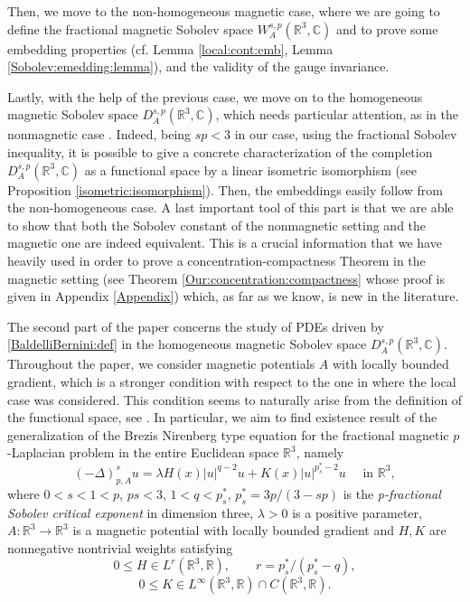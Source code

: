 \documentclass[leqno,11pt]{amsart}
\newcommand{\R}{\mathbb R}
\newcommand{\CC}{\mathbb C}
\numberwithin{equation}{section}
\begin{document}
Then, we move to the non-homogeneous magnetic case, where we are going to define the fractional magnetic Sobolev space $W^{s,p}_A(\R^3,\CC)$ and to prove some embedding properties (cf. Lemma \ref{local:cont:emb}, Lemma \ref{Sobolev:emedding:lemma}), and the validity of the gauge invariance.

Lastly, with the help of the previous case, we move on to the homogeneous magnetic Sobolev space $D^{s,p}_A(\R^3,\CC)$, which needs particular attention, as in the nonmagnetic case \cite{BrascoGV}. Indeed, being $sp<3$ in our case, using the fractional Sobolev inequality, it is possible to give a concrete characterization of the completion $D^{s,p}_A(\R^3,\CC)$ as a functional space by a linear isometric isomorphism (see Proposition \ref{isometric:isomorphism}). Then, the embeddings easily follow from the non-homogeneous case. A last important tool of this part is that we are able to show that both the Sobolev constant of the nonmagnetic setting and the magnetic one are indeed equivalent. This is a crucial information that we have heavily used in order to prove a concentration-compactness Theorem in the magnetic setting (see Theorem \ref{Our:concentration:compactness} whose proof is given in Appendix \ref{Appendix}) which, as far as we know, is new in the literature.

\medskip

The second part of the paper concerns the study of PDEs driven by \eqref{BaldelliBernini:def} in the homogeneous magnetic Sobolev space $D^{s,p}_A(\R^3,\CC)$.
Throughout the paper, we consider magnetic potentials $A$ with locally bounded gradient, which is a stronger condition with respect to the one in \cite{bfk} where the local case was considered. This condition seems to naturally arise from the definition of the functional space, see \cite[Proposition 2.2]{dAveniaSquassina}.
In particular, we aim to find existence result of the generalization of the Brezis Nirenberg type equation for the fractional magnetic $p$-Laplacian problem in the entire Euclidean space $\R^3$, namely
\begin{equation}
    \label{main:equation}
    (-\Delta)^s_{p,A}u =\lambda H(x)|u|^{q-2}u+K(x)|u|^{p^*_{s}-2}u\quad \text{ in } \R^3,
\end{equation}
where $0<s<1<p$, $ps<3$, $1<q<p^*_s$, $p^*_s=3p/(3-sp)$ is the \textit{p-fractional Sobolev critical exponent} in dimension three, $\lambda>0$ is a positive parameter, $A:\R^3 \to \R^3$ is a magnetic potential with locally bounded
gradient and $H,K$ are nonnegative nontrivial weights satisfying
\begin{equation}\label{H:hyp}\tag{H}
0\le H\in L^{r}(\R^3, \R), \qquad r=p^*_{s}/(p^*_{s}-q),
\end{equation}
\begin{equation}\label{K:hyp}\tag{K}
0\le K\in L^{\infty}(\R^3, \R)\cap C(\R^3, \R).
\end{equation}
\end{document}
